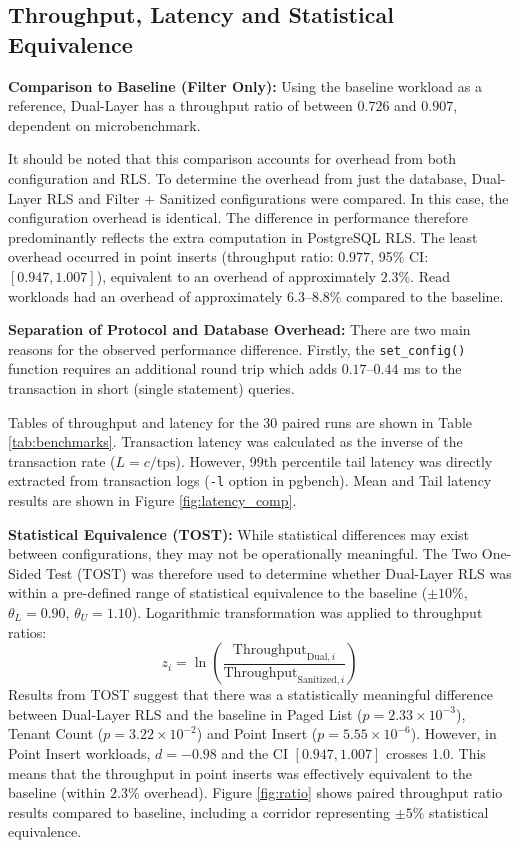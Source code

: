 \documentclass[conference]{IEEEtran}
\begin{document}
\subsection{Throughput, Latency and Statistical Equivalence}
\textbf{Comparison to Baseline (Filter Only):} Using the baseline workload as a reference, Dual-Layer has a throughput ratio of between $0.726$ and $0.907$, dependent on microbenchmark.

It should be noted that this comparison accounts for overhead from both configuration and RLS. To determine the overhead from just the database, Dual-Layer RLS and Filter + Sanitized configurations were compared. In this case, the configuration overhead is identical. The difference in performance therefore predominantly reflects the extra computation in PostgreSQL RLS. The least overhead occurred in point inserts (throughput ratio: $0.977$, 95\% CI: $[0.947, 1.007]$), equivalent to an overhead of approximately $2.3\%$. Read workloads had an overhead of approximately $6.3$--$8.8\%$ compared to the baseline.

\textbf{Separation of Protocol and Database Overhead:} There are two main reasons for the observed performance difference. Firstly, the \texttt{set\_config()} function requires an additional round trip which adds $0.17$--$0.44$ ms to the transaction in short (single statement) queries.

Tables of throughput and latency for the 30 paired runs are shown in Table \ref{tab:benchmarks}. Transaction latency was calculated as the inverse of the transaction rate ($L = c/\text{tps}$). However, 99th percentile tail latency was directly extracted from transaction logs (\texttt{-l} option in pgbench). Mean and Tail latency results are shown in Figure \ref{fig:latency_comp}.

\textbf{Statistical Equivalence (TOST):} While statistical differences may exist between configurations, they may not be operationally meaningful. The Two One-Sided Test (TOST) \cite{schuirmann1987, lakens2018} was therefore used to determine whether Dual-Layer RLS was within a pre-defined range of statistical equivalence to the baseline ($\pm 10\%$, $\theta_L=0.90$, $\theta_U=1.10$). Logarithmic transformation was applied to throughput ratios:
\begin{equation}
z_i = \ln\left(\frac{\text{Throughput}_{\text{Dual},i}}{\text{Throughput}_{\text{Sanitized},i}}\right)
\end{equation}
Results from TOST suggest that there was a statistically meaningful difference between Dual-Layer RLS and the baseline in Paged List ($p=2.33 \times 10^{-3}$), Tenant Count ($p=3.22 \times 10^{-2}$) and Point Insert ($p=5.55 \times 10^{-6}$). However, in Point Insert workloads, $d=-0.98$ and the CI $[0.947, 1.007]$ crosses 1.0. This means that the throughput in point inserts was effectively equivalent to the baseline (within $2.3\%$ overhead). Figure \ref{fig:ratio} shows paired throughput ratio results compared to baseline, including a corridor representing $\pm 5\%$ statistical equivalence.
\end{document}
